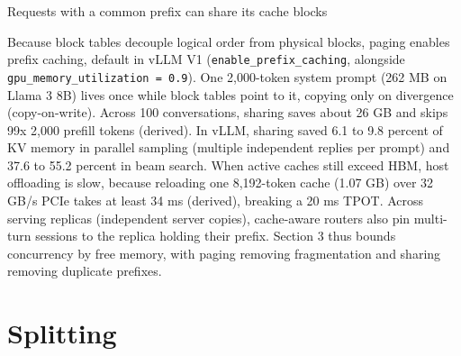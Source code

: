 \documentclass[aspectratio=169, 12pt]{beamer}
\begin{document}
\begin{frame}{Requests with a common prefix can share its cache blocks}
{    Because block tables decouple logical order from physical blocks, paging enables prefix caching, default in vLLM V1 (\texttt{enable\_prefix\_caching}, alongside \texttt{gpu\_memory\_utilization = 0.9}). One 2,000-token system prompt (262 MB on Llama 3 8B) lives once while block tables point to it, copying only on divergence (copy-on-write). Across 100 conversations, sharing saves about 26 GB and skips 99x 2,000 prefill tokens (derived). In vLLM, sharing saved 6.1 to 9.8 percent of KV memory in parallel sampling (multiple independent replies per prompt) and 37.6 to 55.2 percent in beam search. When active caches still exceed HBM, host offloading is slow, because reloading one 8,192-token cache (1.07 GB) over 32 GB/s PCIe takes at least 34 ms (derived), breaking a 20 ms TPOT. Across serving replicas (independent server copies), cache-aware routers also pin multi-turn sessions to the replica holding their prefix. Section 3 thus bounds concurrency by free memory, with paging removing fragmentation and sharing removing duplicate prefixes.


  }
\end{frame}

\section{Splitting}
\end{document}
